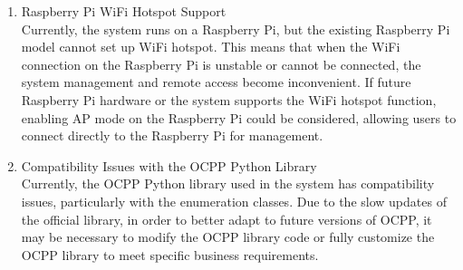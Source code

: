 \documentclass[
english,
ruledheaders=section,%
class=report,%
thesis={type=Report},%
accentcolor=9c,%
custommargins=true,%
marginpar=false,%
parskip=half-,%
fontsize=11pt,%
logofile={img/tuda_logo.pdf}, %
]{tudapub}
\begin{document}
\begin{enumerate}

            \item Raspberry Pi WiFi Hotspot Support\\
            Currently, the system runs on a Raspberry Pi, but the existing Raspberry Pi model cannot set up WiFi hotspot. This means that when the WiFi connection on the Raspberry Pi is unstable or cannot be connected, the system management and remote access become inconvenient. If future Raspberry Pi hardware or the system supports the WiFi hotspot function, enabling AP mode on the Raspberry Pi could be considered, allowing users to connect directly to the Raspberry Pi for management.


            \item Compatibility Issues with the OCPP Python Library\\
            Currently, the OCPP Python library used in the system has compatibility issues, particularly with the enumeration classes. Due to the slow updates of the official library, in order to better adapt to future versions of OCPP, it may be necessary to modify the OCPP library code or fully customize the OCPP library to meet specific business requirements.



\end{enumerate}
\end{document}
